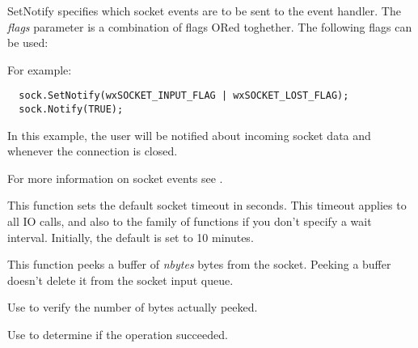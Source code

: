 SetNotify specifies which socket events are to be sent to the event handler.
The {\it flags} parameter is a combination of flags ORed toghether. The
following flags can be used:

\twocolwidtha{7cm}
\begin{twocollist}\itemsep=0pt
\end{twocollist}

For example:

\begin{verbatim}
  sock.SetNotify(wxSOCKET_INPUT_FLAG | wxSOCKET_LOST_FLAG);
  sock.Notify(TRUE);
\end{verbatim}

In this example, the user will be notified about incoming socket data and
whenever the connection is closed.

For more information on socket events see .

%
%
\label{wxsocketbasesettimeout}


This function sets the default socket timeout in seconds. This timeout
applies to all IO calls, and also to the  
family of functions if you don't specify a wait interval. Initially, the
default is set to 10 minutes.

%
%
\label{wxsocketbasepeek}


This function peeks a buffer of {\it nbytes} bytes from the socket.
Peeking a buffer doesn't delete it from the socket input queue.

Use  to verify the number of bytes actually peeked.

Use  to determine if the operation succeeded.




